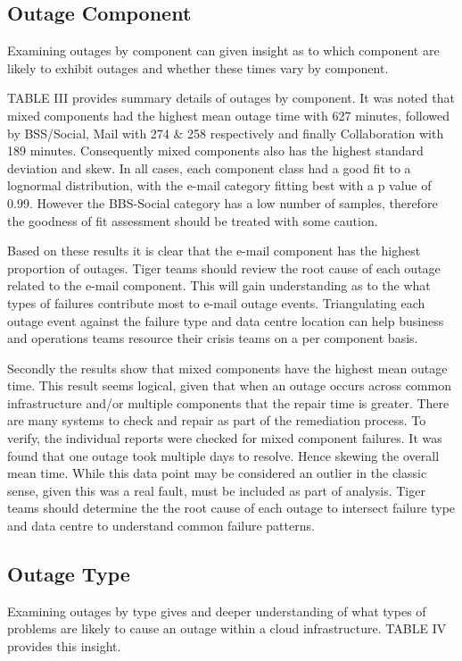 \documentclass[conference]{IEEEtran}
\begin{document}
\subsection{Outage Component}

Examining outages by component can given insight as to which component are likely to exhibit outages and whether these times vary by component. \par

TABLE III provides summary details of outages by component. It was noted that mixed components had the highest mean outage time with 627 minutes, followed by BSS/Social, Mail with 274 \& 258 respectively and finally Collaboration with 189 minutes. Consequently mixed components also has the highest standard deviation and skew. In all cases, each component class had a good fit to a lognormal distribution, with the e-mail category fitting best with a p value of 0.99. However the BBS-Social category has a low number of samples, therefore the goodness of fit assessment should be treated with some caution. \par

Based on these results it is clear that the e-mail component has the highest proportion of outages. Tiger teams should review the root cause of each outage related to the e-mail component.  This will gain understanding as to the what types of failures contribute most to e-mail outage events. Triangulating each outage event against the failure type and data centre location can help business and operations teams resource their crisis teams on a per component basis.

Secondly the results show that mixed components have the highest mean outage time. This result seems logical, given that when an outage occurs across common infrastructure and/or multiple components that the repair time is greater. There are many systems to check and repair as part of the remediation process. To verify, the individual reports were checked for mixed component failures. It was found that one outage took multiple days to resolve. Hence skewing the overall mean time. While this data point may be considered an outlier in the classic sense, given this was a real fault, must be included as part of analysis. Tiger teams should determine the the root cause of each outage to intersect failure type and data centre to understand common failure patterns. \par


\subsection{Outage Type}
Examining outages by type gives and deeper understanding of what types of problems are likely to cause an outage within a cloud infrastructure. TABLE IV provides this insight. \par
\end{document}
